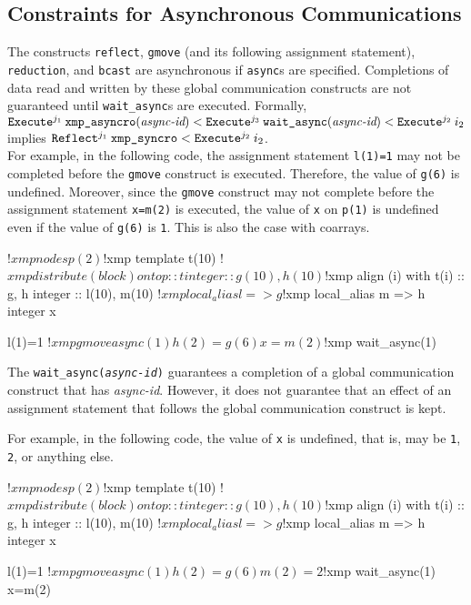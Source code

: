\subsection{Constraints for Asynchronous Communications}

The constructs \texttt{reflect}, \texttt{gmove} (and its following
assignment statement), \texttt{reduction}, and \texttt{bcast} are
asynchronous if \texttt{async}s are specified.  Completions of data
read and written by these global communication constructs are not
guaranteed until \texttt{wait\_async}s are executed.  Formally,\\

\noindent
$\texttt{Execute}^{j_1} \: {\texttt{xmp\_asyncro}(\textit{async-id})} < \texttt{Execute}^{j_3} \: {\texttt{wait\_async}(\textit{async-id})} < \texttt{Execute}^{j_2} \: {i_2}$\\
implies $\texttt{Reflect}^{j_1} \: {\texttt{xmp\_syncro}} < \texttt{Execute}^{j_2} \: {i_2}$.\\

For example, in the following code, the assignment statement \texttt{l(1)=1} may
not be completed before the \texttt{gmove} construct is executed.
Therefore, the value of \texttt{g(6)} is undefined.  Moreover, since
the \texttt{gmove} construct may not complete before the assignment statement
\texttt{x=m(2)} is executed, the value of \texttt{x} on \texttt{p(1)}
is undefined even if the value of \texttt{g(6)} is \texttt{1}.  This
is also the case with coarrays.
\begin{center}
\begin{XFexample}
!$xmp nodes p(2)
!$xmp template t(10)
!$xmp distribute (block) onto p :: t
      integer :: g(10), h(10)
!$xmp align (i) with t(i) :: g, h
      integer :: l(10), m(10)
!$xmp local_alias l => g
!$xmp local_alias m => h
      integer x

      l(1)=1
!$xmp gmove async(1)
      h(2)=g(6)
      x=m(2)
!$xmp wait_async(1)
\end{XFexample}
\end{center}

The \texttt{wait\_async(\textit{async-id})} guarantees a completion of
a global communication construct that has \textit{async-id}.  However,
it does not guarantee that an effect of an assignment statement that
follows the global communication construct is kept.

For example, in the following code, the value of \texttt{x} is
undefined, that is, may be \texttt{1}, \texttt{2}, or anything else.
\begin{center}
\begin{XFexample}
!$xmp nodes p(2)
!$xmp template t(10)
!$xmp distribute (block) onto p :: t
      integer :: g(10), h(10)
!$xmp align (i) with t(i) :: g, h
      integer :: l(10), m(10)
!$xmp local_alias l => g
!$xmp local_alias m => h
      integer x

      l(1)=1
!$xmp gmove async(1)
      h(2)=g(6)
      m(2)=2
!$xmp wait_async(1)
      x=m(2)
\end{XFexample}
\end{center}



%


